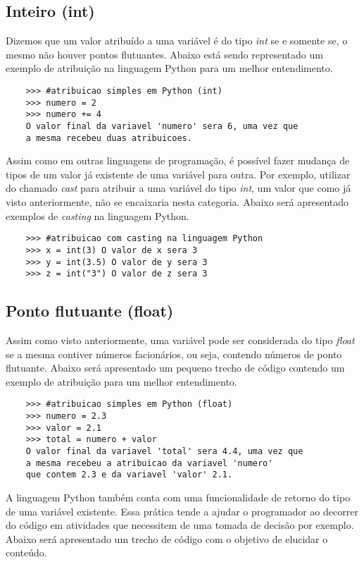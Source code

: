 \subsection{Inteiro (int)}
Dizemos que um valor atribuído a uma variável é do tipo \textit{int} se e somente se, o mesmo não houver pontos flutuantes. Abaixo está sendo representado um exemplo de atribuição na linguagem Python para um melhor entendimento.

\begin{lstlisting}
	>>> #atribuicao simples em Python (int)
	>>> numero = 2
	>>> numero += 4
	O valor final da variavel 'numero' sera 6, uma vez que 
	a mesma recebeu duas atribuicoes.
\end{lstlisting} 

Assim como em outras linguagens de programação, é possível fazer mudança de tipos de um valor já existente de uma variável para outra. Por exemplo, utilizar do chamado \textit{cast} para atribuir a uma variável do tipo \textit{int}, um valor que como já visto anteriormente, não se encaixaria nesta categoria. Abaixo será apresentado exemplos de \textit{casting} na linguagem Python.
   
\begin{lstlisting}
	>>> #atribuicao com casting na linguagem Python
	>>> x = int(3) O valor de x sera 3  
	>>> y = int(3.5) O valor de y sera 3 
	>>> z = int("3") O valor de z sera 3 
\end{lstlisting} 

\subsection{Ponto flutuante (float)}
Assim como visto anteriormente, uma variável pode ser considerada do tipo \textit{float} se a mesma contiver números facionários, ou seja, contendo números de ponto flutuante. Abaixo será apresentado um pequeno trecho de código contendo um exemplo de atribuição para um melhor entendimento.

\begin{lstlisting}
	>>> #atribuicao simples em Python (float)
	>>> numero = 2.3
	>>> valor = 2.1
	>>> total = numero + valor
	O valor final da variavel 'total' sera 4.4, uma vez que 
	a mesma recebeu a atribuicao da variavel 'numero'
	que contem 2.3 e da variavel 'valor' 2.1.
\end{lstlisting} 

A linguagem Python também conta com uma funcionalidade de retorno do tipo de uma variável existente. Essa prática tende a ajudar o programador ao decorrer do código em atividades que necessitem de uma tomada de decisão por exemplo. Abaixo será apresentado um trecho de código com o objetivo de elucidar o conteúdo.

